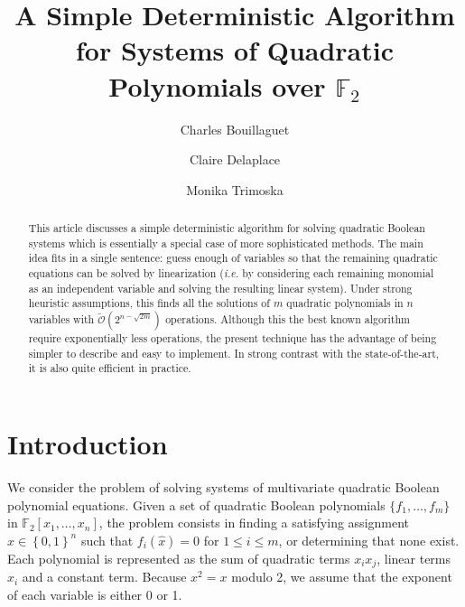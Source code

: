 \documentclass[a4paper,UKenglish,cleveref, autoref]{lipics-v2019}
\title{A Simple Deterministic Algorithm for Systems of Quadratic Polynomials over $\mathbb{F}_2$}
\author{Charles Bouillaguet}{LIP6 laboratory, Sorbonne Université, Paris, France}{charles.bouillaguet@lip6.fr}{https://orcid.org/0000-0001-9416-6244}{}
\author{Claire Delaplace}{MIS Laboratory, Université de Picardie Jules Verne, Amiens, France}{claire.delaplace@u-picardie.fr}{}{}
\author{Monika Trimoska}{MIS Laboratory, Université de Picardie Jules Verne, Amiens, France}{monika.trimoska@u-picardie.fr}{}{}
\newcommand{\bits}{\left\{0, 1\right\}}
\newcommand{\bigOsoft}[1]{\ensuremath{\mathcal{\tilde O}\left( #1 \right)} }
\begin{document}
\maketitle

\begin{abstract}
  This article discusses a simple deterministic algorithm for solving quadratic
  Boolean systems which is essentially a special case of more sophisticated
  methods. The main idea fits in a single sentence: guess enough of variables so
  that the remaining quadratic equations can be solved by linearization
  (\textit{i.e.} by considering each remaining monomial as an independent
  variable and solving the resulting linear system). Under strong heuristic
  assumptions, this finds all the solutions of $m$ quadratic polynomials in $n$
  variables with $\bigOsoft{2^{n-\sqrt{2m}}}$ operations. Although this the best
  known algorithm require exponentially less operations, the present technique
  has the advantage of being simpler to describe and easy to implement. In
  strong contrast with the state-of-the-art, it is also quite efficient in
  practice.
\end{abstract}


\clearpage

\section{Introduction}

We consider the problem of solving systems of multivariate quadratic Boolean
polynomial equations. Given a set of quadratic Boolean polynomials
$\{f_1, \dots, f_m\}$ in $\mathbb{F}_2[x_1, \dots, x_n]$, the problem consists
in finding a satisfying assignment $\hat x \in \bits^n$ such that
$f_i(\hat x) = 0$ for $1 \leq i \leq m$, or determining that none exist. Each
polynomial is represented as the sum of quadratic terms $x_i x_j$, linear terms
$x_i$ and a constant term. Because $x^2 = x$ modulo 2, we assume that the
exponent of each variable is either 0 or 1.


\end{document}
